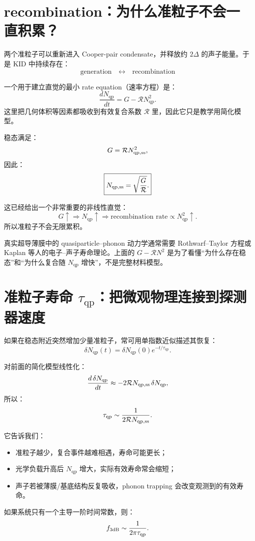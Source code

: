 \documentclass[11pt,a4paper,openany]{ctexrep}
\newcommand{\qp}{\mathrm{qp}}
\begin{document}
\section{recombination：为什么准粒子不会一直积累？}

两个准粒子可以重新进入 Cooper-pair condensate，并释放约 $2\Delta$ 的声子能量。于是 KID 中持续存在：
\[
\boxed{\text{generation}\quad\leftrightarrow\quad\text{recombination}}
\]

一个用于建立直觉的最小 rate equation（速率方程）是：
\[
\boxed{
\frac{dN_{\qp}}{dt}
=
G-\mathcal{R}N_{\qp}^2.
}
\]
这里把几何体积等因素都吸收到有效复合系数 $\mathcal{R}$ 里，因此它只是教学用简化模型。

稳态满足：
\[
G=\mathcal{R}N_{\qp,\rm ss}^2,
\]
因此：
\[
\boxed{
N_{\qp,\rm ss}
=
\sqrt{\frac{G}{\mathcal{R}}}.
}
\]

这已经给出一个非常重要的非线性直觉：
\[
G\uparrow
\Rightarrow
N_{\qp}\uparrow
\Rightarrow
\text{recombination rate}\propto N_{\qp}^2\uparrow.
\]
所以准粒子不会无限累积。

\begin{mistakebox}
真实超导薄膜中的 quasiparticle--phonon 动力学通常需要 Rothwarf--Taylor 方程或 Kaplan 等人的电子--声子寿命理论。上面的 $G-\mathcal{R}N^2$ 是为了看懂“为什么存在稳态”和“为什么复合随 $N_{\qp}$ 增快”，不是完整材料模型。
\end{mistakebox}

\section{准粒子寿命 $\tau_{\qp}$：把微观物理连接到探测器速度}

如果在稳态附近突然增加少量准粒子，常可用单指数近似描述其恢复：
\[
\boxed{
\delta N_{\qp}(t)
=
\delta N_{\qp}(0)e^{-t/\tau_{\qp}}.
}
\]

对前面的简化模型线性化：
\[
\frac{d\,\delta N_{\qp}}{dt}
\approx
-2\mathcal{R}N_{\qp,\rm ss}\,\delta N_{\qp},
\]
所以：
\[
\tau_{\qp}
\sim
\frac{1}{2\mathcal{R}N_{\qp,\rm ss}}.
\]

它告诉我们：
\begin{itemize}
  \item 准粒子越少，复合事件越难相遇，寿命可能更长；
  \item 光学负载升高后 $N_{\qp}$ 增大，实际有效寿命常会缩短；
  \item 声子若被薄膜/基底结构反复吸收，phonon trapping 会改变观测到的有效寿命。
\end{itemize}

如果系统只有一个主导一阶时间常数，则：
\[
f_{\rm 3dB}\sim\frac{1}{2\pi\tau_{\qp}}.
\]
\end{document}
